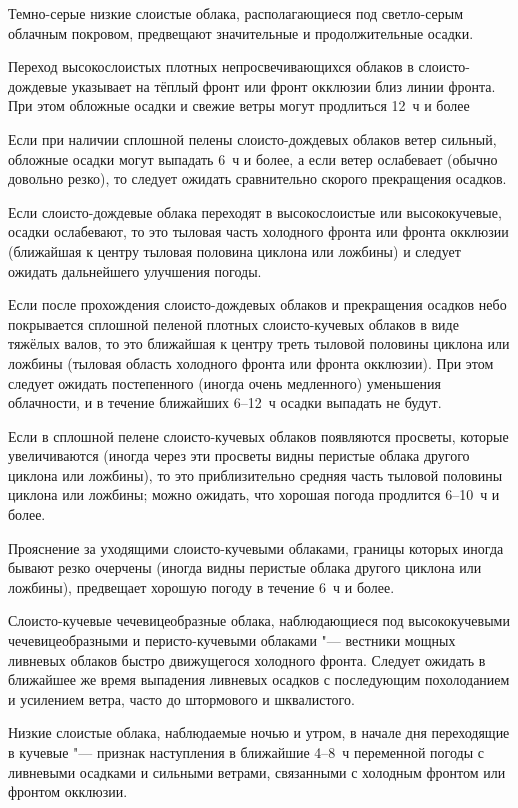  Темно-серые низкие слоистые облака, располагающиеся под
светло-серым облачным покровом, предвещают значительные и
продолжительные осадки.

 Переход высокослоистых плотных непросвечивающихся облаков в
слоисто-дождевые указывает на тёплый фронт или фронт окклюзии близ
линии фронта. При этом обложные осадки и свежие ветры могут продлиться
12~ч и более

 Если при наличии сплошной пелены слоисто-дождевых облаков ветер
сильный, обложные осадки могут выпадать 6~ч и более, а если ветер
ослабевает (обычно довольно резко), то следует ожидать сравнительно
скорого прекращения осадков.

 Если слоисто-дождевые облака переходят в высокослоистые или
высококучевые, осадки ослабевают, то это тыловая часть холодного
фронта или фронта окклюзии (ближайшая к центру тыловая половина
циклона или ложбины) и следует ожидать дальнейшего улучшения погоды.

 Если после прохождения слоисто-дождевых облаков и прекращения
осадков небо покрывается сплошной пеленой плотных слоисто-кучевых
облаков в виде тяжёлых валов, то это ближайшая к центру треть тыловой
половины циклона или ложбины (тыловая область холодного фронта или
фронта окклюзии). При этом следует ожидать постепенного (иногда очень
медленного) уменьшения облачности, и в течение ближайших 6--12~ч
осадки выпадать не будут.

 Если в сплошной пелене слоисто-кучевых облаков появляются
просветы, которые увеличиваются (иногда через эти просветы видны
перистые облака другого циклона или ложбины), то это приблизительно
средняя часть тыловой половины циклона или ложбины; можно ожидать, что
хорошая погода продлится 6--10~ч и более.

 Прояснение за уходящими слоисто-кучевыми облаками, границы
которых иногда бывают резко очерчены (иногда видны перистые облака
другого циклона или ложбины), предвещает хорошую погоду в течение 6~ч
и более.

 Слоисто-кучевые чечевицеобразные облака, наблюдающиеся под
высококучевыми чечевицеобразными и перисто-кучевыми облаками "---
вестники мощных ливневых облаков быстро движущегося холодного
фронта. Следует ожидать в ближайшее же время выпадения ливневых осадков
с последующим похолоданием и усилением ветра, часто до штормового и
шквалистого.

 Низкие слоистые облака, наблюдаемые ночью и утром, в начале дня
переходящие в кучевые "--- признак наступления в ближайшие 4--8~ч
переменной погоды с ливневыми осадками и сильными ветрами, связанными
с холодным фронтом или фронтом окклюзии.

